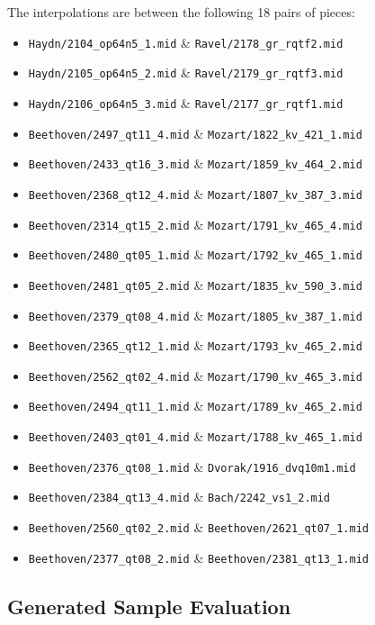 \documentclass[sigconf,authorversion]{acmart}
\providecommand{\tightlist}{%
  \setlength{\itemsep}{0pt}\setlength{\parskip}{0pt}}
\begin{document}
The interpolations are between the following 18 pairs of pieces:

\begin{itemize}
\tightlist
\item \texttt{Haydn/2104\_op64n5\_1.mid} \& \texttt{Ravel/2178\_gr\_rqtf2.mid}
\item \texttt{Haydn/2105\_op64n5\_2.mid} \&   \texttt{Ravel/2179\_gr\_rqtf3.mid}
\item \texttt{Haydn/2106\_op64n5\_3.mid} \&   \texttt{Ravel/2177\_gr\_rqtf1.mid}
\item \texttt{Beethoven/2497\_qt11\_4.mid} \& \texttt{Mozart/1822\_kv\_421\_1.mid}
\item \texttt{Beethoven/2433\_qt16\_3.mid} \& \texttt{Mozart/1859\_kv\_464\_2.mid}
\item \texttt{Beethoven/2368\_qt12\_4.mid} \& \texttt{Mozart/1807\_kv\_387\_3.mid}
\item \texttt{Beethoven/2314\_qt15\_2.mid} \& \texttt{Mozart/1791\_kv\_465\_4.mid}
\item \texttt{Beethoven/2480\_qt05\_1.mid} \& \texttt{Mozart/1792\_kv\_465\_1.mid}
\item \texttt{Beethoven/2481\_qt05\_2.mid} \& \texttt{Mozart/1835\_kv\_590\_3.mid}
\item \texttt{Beethoven/2379\_qt08\_4.mid} \& \texttt{Mozart/1805\_kv\_387\_1.mid}
\item \texttt{Beethoven/2365\_qt12\_1.mid} \& \texttt{Mozart/1793\_kv\_465\_2.mid}
\item \texttt{Beethoven/2562\_qt02\_4.mid} \& \texttt{Mozart/1790\_kv\_465\_3.mid}
\item \texttt{Beethoven/2494\_qt11\_1.mid} \& \texttt{Mozart/1789\_kv\_465\_2.mid}
\item \texttt{Beethoven/2403\_qt01\_4.mid} \& \texttt{Mozart/1788\_kv\_465\_1.mid}
\item \texttt{Beethoven/2376\_qt08\_1.mid} \& \texttt{Dvorak/1916\_dvq10m1.mid}
\item \texttt{Beethoven/2384\_qt13\_4.mid} \& \texttt{Bach/2242\_vs1\_2.mid}
\item \texttt{Beethoven/2560\_qt02\_2.mid} \& \texttt{Beethoven/2621\_qt07\_1.mid}
\item \texttt{Beethoven/2377\_qt08\_2.mid} \& \texttt{Beethoven/2381\_qt13\_1.mid}
\end{itemize}

\subsection{Generated Sample Evaluation}
\end{document}
